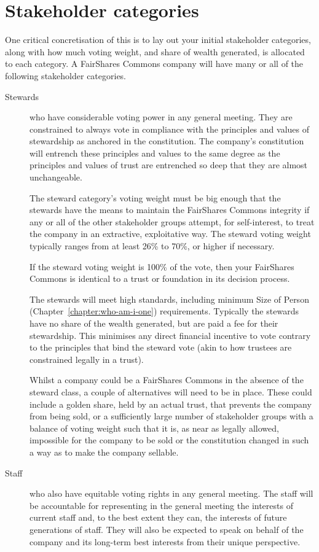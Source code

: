 \section{Stakeholder categories}
One critical concretisation of this is to lay out your initial stakeholder categories, along with how much voting weight, and share of wealth generated, is allocated to each category. A FairShares Commons company will have many or all of the following stakeholder categories.
\begin{description}
\item[Stewards] who have considerable voting power in any general meeting. They are constrained to always vote in compliance with the principles and values of stewardship as anchored in the constitution. The company’s constitution will entrench these principles and values to the same degree as the principles and values of trust are entrenched so deep that they are almost unchangeable. 


The steward category’s voting weight must be big enough that the stewards have the means to maintain the FairShares Commons integrity if any or all of the other stakeholder groups attempt, for self-interest, to treat the company in an extractive, exploitative way. The steward voting weight typically ranges from at least 26\% to 70\%, or higher if necessary.


If the steward voting weight is 100\% of the vote, then your FairShares Commons is identical to a trust or foundation in its decision process.


The stewards will meet high standards, including minimum Size of Person (Chapter~\ref{chapter:who-am-i-one}) requirements. Typically the stewards have no share of the wealth generated, but are paid a fee for their stewardship. This minimises any direct financial incentive to vote contrary to the principles that bind the steward vote (akin to how trustees are constrained legally in a trust).


Whilst a company could be a FairShares Commons in the absence of the steward class, a couple of alternatives will need to be in place. These could include a golden share, held by an actual trust, that prevents the company from being sold, or a sufficiently large number of stakeholder groups with a balance of voting weight such that it is, as near as legally allowed, impossible for the company to be sold or the constitution changed in such a way as to make the company sellable.


\item[Staff] who also have equitable voting rights in any general meeting. The staff will be accountable for representing in the general meeting the interests of current staff and, to the best extent they can, the interests of future generations of staff. They will also be expected to speak on behalf of the company and its long-term best interests from their unique perspective.



\end{description}
